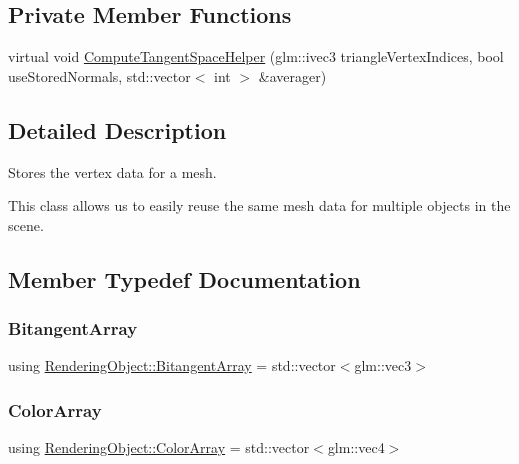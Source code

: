 \subsection*{Private Member Functions}
\begin{DoxyCompactItemize}
\item
virtual void \hyperlink{class_rendering_object_a053e68759fe406779c6b6cfa080602bf}{Compute\+Tangent\+Space\+Helper} (glm\+::ivec3 triangle\+Vertex\+Indices, bool use\+Stored\+Normals, std\+::vector$<$ int $>$ \&averager)
\end{DoxyCompactItemize}


\subsection{Detailed Description}
Stores the vertex data for a mesh.

This class allows us to easily reuse the same mesh data for multiple objects in the scene.

\subsection{Member Typedef Documentation}
\hypertarget{class_rendering_object_a6c6bf305a5f0f9ce1006f374c753c856}{}\label{class_rendering_object_a6c6bf305a5f0f9ce1006f374c753c856}
\subsubsection{\texorpdfstring{Bitangent\+Array}{BitangentArray}}
{\footnotesize\ttfamily using \hyperlink{class_rendering_object_a6c6bf305a5f0f9ce1006f374c753c856}{Rendering\+Object\+::\+Bitangent\+Array} =  std\+::vector$<$glm\+::vec3$>$}

\hypertarget{class_rendering_object_a8a12e1f9be788d99af6c089e1c600022}{}\label{class_rendering_object_a8a12e1f9be788d99af6c089e1c600022}
\subsubsection{\texorpdfstring{Color\+Array}{ColorArray}}
{\footnotesize\ttfamily using \hyperlink{class_rendering_object_a8a12e1f9be788d99af6c089e1c600022}{Rendering\+Object\+::\+Color\+Array} =  std\+::vector$<$glm\+::vec4$>$}

